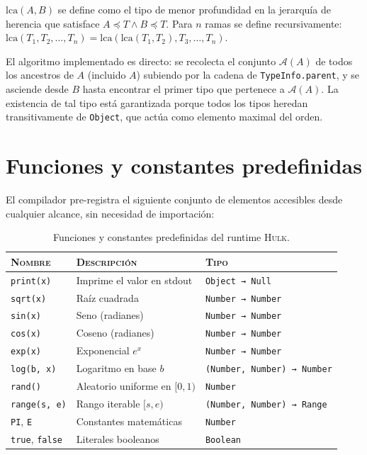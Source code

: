 \documentclass[11pt,a4paper,oneside,openany]{report}
\newcommand{\hulk}{\textsc{Hulk}}
\newcommand{\code}[1]{\texttt{#1}}
\begin{document}
\begin{definition}[title={Definición: ancestro común más cercano}]
$\mathrm{lca}(A, B)$ se define como el tipo de menor profundidad en la jerarquía
de herencia que satisface $A \preceq T \land B \preceq T$. Para $n$ ramas se
define recursivamente:
$\mathrm{lca}(T_1, T_2, \ldots, T_n) = \mathrm{lca}(\mathrm{lca}(T_1, T_2), T_3,
\ldots, T_n)$.
\end{definition}

El algoritmo implementado es directo: se recolecta el conjunto $\mathcal{A}(A)$ de
todos los ancestros de $A$ (incluido $A$) subiendo por la cadena de
\code{TypeInfo.parent}, y se asciende desde $B$ hasta encontrar el primer tipo que
pertenece a $\mathcal{A}(A)$. La existencia de tal tipo está garantizada porque
todos los tipos heredan transitivamente de \code{Object}, que actúa como elemento
maximal del orden.

\section{Funciones y constantes predefinidas}

El compilador pre-registra el siguiente conjunto de elementos accesibles desde
cualquier alcance, sin necesidad de importación:

\begin{table}[H]
\centering
\caption{Funciones y constantes predefinidas del runtime \hulk{}.}
\label{tab:builtins}
\begin{tabularx}{\textwidth}{lXl}
\toprule
\textsc{Nombre} & \textsc{Descripción} & \textsc{Tipo} \\
\midrule
\code{print(x)}            & Imprime el valor en stdout                & \code{Object → Null} \\
\code{sqrt(x)}             & Raíz cuadrada                              & \code{Number → Number} \\
\code{sin(x)}              & Seno (radianes)                            & \code{Number → Number} \\
\code{cos(x)}              & Coseno (radianes)                          & \code{Number → Number} \\
\code{exp(x)}              & Exponencial $e^x$                          & \code{Number → Number} \\
\code{log(b, x)}           & Logaritmo en base $b$                      & \code{(Number, Number) → Number} \\
\code{rand()}              & Aleatorio uniforme en $[0,1)$              & \code{Number} \\
\code{range(s, e)}         & Rango iterable $[s, e)$                    & \code{(Number, Number) → Range} \\
\code{PI}, \code{E}        & Constantes matemáticas                     & \code{Number} \\
\code{true}, \code{false}  & Literales booleanos                        & \code{Boolean} \\
\bottomrule
\end{tabularx}
\end{table}
\end{document}
